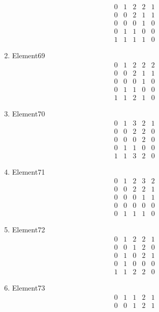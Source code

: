 \documentclass[12pt]{article}
\begin{document}
\begin{multicols}{3}
\begin{enumerate}
\begin{equation*}
\begin{array}{ccccc}
0&1&2&2&1\\
0&0&2&1&1\\
0&0&0&1&0\\
0&1&1&0&0\\
1&1&1&1&0
\end{array}
\end{equation*}
\item Element69
\begin{equation*}
\begin{array}{ccccc}
0&1&2&2&2\\
0&0&2&1&1\\
0&0&0&1&0\\
0&1&1&0&0\\
1&1&2&1&0
\end{array}
\end{equation*}
\item Element70
\begin{equation*}
\begin{array}{ccccc}
0&1&3&2&1\\
0&0&2&2&0\\
0&0&0&2&0\\
0&1&1&0&0\\
1&1&3&2&0
\end{array}
\end{equation*}
\item Element71
\begin{equation*}
\begin{array}{ccccc}
0&1&2&3&2\\
0&0&2&2&1\\
0&0&0&1&1\\
0&0&0&0&0\\
0&1&1&1&0
\end{array}
\end{equation*}
\item Element72
\begin{equation*}
\begin{array}{ccccc}
0&1&2&2&1\\
0&0&1&2&0\\
0&1&0&2&1\\
0&1&0&0&0\\
1&1&2&2&0
\end{array}
\end{equation*}
\item Element73
\begin{equation*}
\begin{array}{ccccc}
0&1&1&2&1\\
0&0&1&2&1\\

\end{array}
\end{equation*}
\end{enumerate}
\end{multicols}
\end{document}
